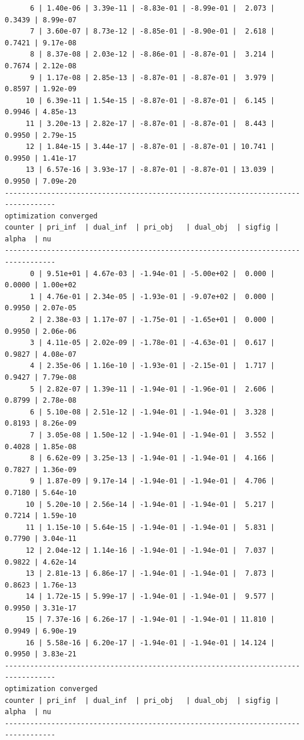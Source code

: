 \documentclass[
]{book}
\begin{document}
\begin{verbatim}
      6 | 1.40e-06 | 3.39e-11 | -8.83e-01 | -8.99e-01 |  2.073 | 0.3439 | 8.99e-07
      7 | 3.60e-07 | 8.73e-12 | -8.85e-01 | -8.90e-01 |  2.618 | 0.7421 | 9.17e-08
      8 | 8.37e-08 | 2.03e-12 | -8.86e-01 | -8.87e-01 |  3.214 | 0.7674 | 2.12e-08
      9 | 1.17e-08 | 2.85e-13 | -8.87e-01 | -8.87e-01 |  3.979 | 0.8597 | 1.92e-09
     10 | 6.39e-11 | 1.54e-15 | -8.87e-01 | -8.87e-01 |  6.145 | 0.9946 | 4.85e-13
     11 | 3.20e-13 | 2.82e-17 | -8.87e-01 | -8.87e-01 |  8.443 | 0.9950 | 2.79e-15
     12 | 1.84e-15 | 3.44e-17 | -8.87e-01 | -8.87e-01 | 10.741 | 0.9950 | 1.41e-17
     13 | 6.57e-16 | 3.93e-17 | -8.87e-01 | -8.87e-01 | 13.039 | 0.9950 | 7.09e-20
----------------------------------------------------------------------------------
optimization converged
counter | pri_inf  | dual_inf  | pri_obj   | dual_obj  | sigfig | alpha  | nu 
----------------------------------------------------------------------------------
      0 | 9.51e+01 | 4.67e-03 | -1.94e-01 | -5.00e+02 |  0.000 | 0.0000 | 1.00e+02
      1 | 4.76e-01 | 2.34e-05 | -1.93e-01 | -9.07e+02 |  0.000 | 0.9950 | 2.07e-05
      2 | 2.38e-03 | 1.17e-07 | -1.75e-01 | -1.65e+01 |  0.000 | 0.9950 | 2.06e-06
      3 | 4.11e-05 | 2.02e-09 | -1.78e-01 | -4.63e-01 |  0.617 | 0.9827 | 4.08e-07
      4 | 2.35e-06 | 1.16e-10 | -1.93e-01 | -2.15e-01 |  1.717 | 0.9427 | 7.79e-08
      5 | 2.82e-07 | 1.39e-11 | -1.94e-01 | -1.96e-01 |  2.606 | 0.8799 | 2.78e-08
      6 | 5.10e-08 | 2.51e-12 | -1.94e-01 | -1.94e-01 |  3.328 | 0.8193 | 8.26e-09
      7 | 3.05e-08 | 1.50e-12 | -1.94e-01 | -1.94e-01 |  3.552 | 0.4028 | 1.85e-08
      8 | 6.62e-09 | 3.25e-13 | -1.94e-01 | -1.94e-01 |  4.166 | 0.7827 | 1.36e-09
      9 | 1.87e-09 | 9.17e-14 | -1.94e-01 | -1.94e-01 |  4.706 | 0.7180 | 5.64e-10
     10 | 5.20e-10 | 2.56e-14 | -1.94e-01 | -1.94e-01 |  5.217 | 0.7214 | 1.59e-10
     11 | 1.15e-10 | 5.64e-15 | -1.94e-01 | -1.94e-01 |  5.831 | 0.7790 | 3.04e-11
     12 | 2.04e-12 | 1.14e-16 | -1.94e-01 | -1.94e-01 |  7.037 | 0.9822 | 4.62e-14
     13 | 2.81e-13 | 6.86e-17 | -1.94e-01 | -1.94e-01 |  7.873 | 0.8623 | 1.76e-13
     14 | 1.72e-15 | 5.99e-17 | -1.94e-01 | -1.94e-01 |  9.577 | 0.9950 | 3.31e-17
     15 | 7.37e-16 | 6.26e-17 | -1.94e-01 | -1.94e-01 | 11.810 | 0.9949 | 6.90e-19
     16 | 5.58e-16 | 6.20e-17 | -1.94e-01 | -1.94e-01 | 14.124 | 0.9950 | 3.83e-21
----------------------------------------------------------------------------------
optimization converged
counter | pri_inf  | dual_inf  | pri_obj   | dual_obj  | sigfig | alpha  | nu 
----------------------------------------------------------------------------------

\end{verbatim}
\end{document}
